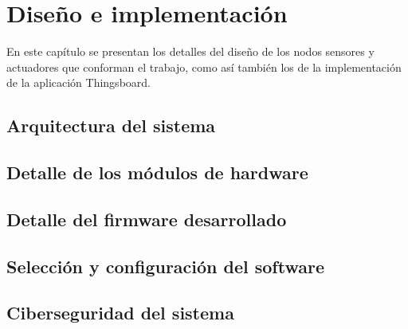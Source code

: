 \chapter{Diseño e implementación} %

\label{Chapter3} %



En este capítulo se presentan los detalles del diseño de los nodos sensores y actuadores que conforman el trabajo, como así también los de la implementación de la aplicación Thingsboard.

\section{Arquitectura del sistema}
\label{sec:Arquitectura del sistema}

\section{Detalle de los módulos de hardware}
\label{sec:Módulos de hardware}

\section{Detalle del firmware desarrollado}
\label{sec:Desarrollo del firmware}

\section{Selección y configuración del software}
\label{sec:Selección y configuración del software}

\section{Ciberseguridad del sistema}
\label{sec:Ciberseguridad del sistema}
